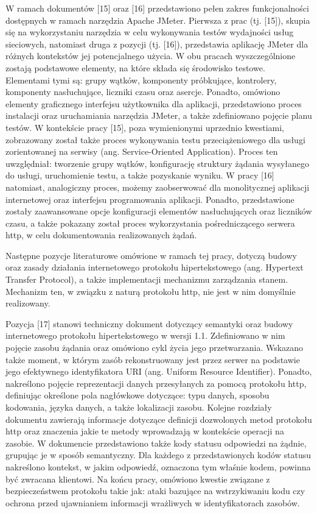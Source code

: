 W ramach dokumentów [15] oraz [16] przedstawiono pełen zakres funkcjonalności dostępnych w ramach narzędzia Apache JMeter. Pierwsza z prac (tj. [15]), skupia się na wykorzystaniu narzędzia w celu wykonywania testów wydajności usług sieciowych, natomiast druga z pozycji (tj. [16]), przedstawia aplikację JMeter dla różnych kontekstów jej potencjalnego użycia. W obu pracach wyszczególnione zostają podstawowe elementy, na które składa się środowisko testowe. Elementami tymi są: grupy wątków, komponenty próbkujące, kontrolery, komponenty nasłuchujące, liczniki czasu oraz asercje. Ponadto,  omówiono elementy graficznego interfejsu użytkownika dla aplikacji, przedstawiono proces instalacji oraz uruchamiania narzędzia JMeter, a także zdefiniowano pojęcie planu testów. W kontekście pracy [15], poza wymienionymi uprzednio kwestiami, zobrazowany został także proces wykonywania testu przeciążeniowego dla usługi zorientowanej na serwisy (ang. Service-Oriented Application). Proces ten uwzględniał: tworzenie grupy wątków, konfigurację struktury żądania wysyłanego do usługi, uruchomienie testu, a także pozyskanie wyniku. W pracy [16] natomiast, analogiczny proces, możemy zaobserwować dla monolitycznej aplikacji internetowej oraz interfejsu programowania aplikacji. Ponadto, przedstawione zostały zaawansowane opcje konfiguracji elementów nasłuchujących oraz liczników czasu, a także pokazany został proces wykorzystania pośredniczącego serwera http, w celu dokumentowania realizowanych żądań.

Następne pozycje literaturowe omówione w ramach tej pracy, dotyczą budowy oraz zasady działania internetowego protokołu hipertekstowego (ang. Hypertext Transfer Protocol), a także implementacji mechanizmu zarządzania stanem. Mechanizm ten, w związku z naturą protokołu http, nie jest w nim domyślnie realizowany.

Pozycja [17] stanowi techniczny dokument dotyczący semantyki oraz budowy internetowego protokołu hipertekstowego w wersji 1.1. Zdefiniowano w nim pojęcie zasobu żądania oraz omówiono cykl życia jego przetwarzania. Wskazano także moment, w którym zasób rekonstruowany jest przez serwer na podstawie jego efektywnego identyfikatora URI (ang. Uniform Resource Identifier). Ponadto, nakreślono pojęcie reprezentacji danych przesyłanych za pomocą protokołu http, definiując określone pola nagłówkowe dotyczące: typu danych, sposobu kodowania, języka danych, a także lokalizacji zasobu. Kolejne rozdziały dokumentu zawierają informacje dotyczące definicji dozwolonych metod protokołu http oraz znaczenia jakie te metody wprowadzają w kontekście operacji na zasobie. W dokumencie przedstawiono także kody statusu odpowiedzi na żądnie, grupując je w sposób semantyczny. Dla każdego z przedstawionych kodów statusu nakreślono kontekst, w jakim odpowiedź, oznaczona tym właśnie kodem, powinna być zwracana klientowi. Na końcu pracy, omówiono kwestie związane z bezpieczeństwem protokołu takie jak: ataki bazujące na wstrzykiwaniu kodu czy ochrona przed ujawnianiem informacji wrażliwych w identyfikatorach zasobów.

